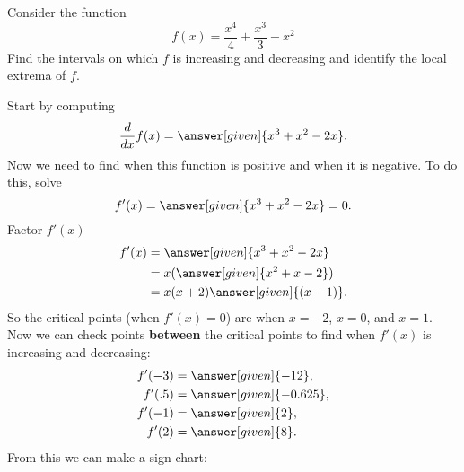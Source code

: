 \documentclass{ximera}
\begin{document}
\begin{example}\label{E:localextrema}
Consider the function 
\[
f(x) = \frac{x^4}{4}+\frac{x^3}{3}-x^2
\]
Find the intervals on which $f$ is increasing and decreasing and
identify the local extrema of $f$.


\begin{explanation}
Start by computing
\[
\ddx f(x) = \answer[given]{x^3+x^2-2x}.
\]
Now we need to find when this function is positive and when it is
negative. To do this, solve 
\[
f'(x) = \answer[given]{x^3+x^2-2x} =0.
\]
Factor $f'(x)$
\begin{align*}
f'(x) &= \answer[given]{x^3+x^2-2x} \\
&=x(\answer[given]{x^2+x-2})\\
&=x(x+2)\answer[given]{(x-1)}.
\end{align*}
So the critical points (when $f'(x)=0$) are when $x=-2$, $x=0$, and
$x=1$. Now we can check points \textbf{between} the critical points to find
when $f'(x)$ is increasing and decreasing:
\begin{align*}
  f'(-3)&=\answer[given]{-12},\\
  f'(.5)&=\answer[given]{-0.625},\\
  f'(-1)&=\answer[given]{2},\\
  f'(2)&=\answer[given]{8}.
\end{align*}
From this we can make a sign-chart:

\begin{image}
\end{image}
\end{explanation}
\end{example}
\end{document}
